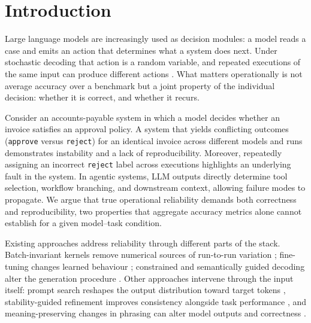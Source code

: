 \section{Introduction}
\label{sec:intro}

Large language models are increasingly used as decision modules: a model reads a
case and emits an action that determines what a system does next. Under stochastic
decoding that action is a random variable, and repeated executions of the same
input can produce different actions
\citep{Ouyang_2025,atil2025nondeterminismdeterministicllmsettings}. What matters
operationally is not average accuracy over a benchmark but a joint property of the
individual decision: whether it is correct, and whether it recurs.

Consider an accounts-payable system in which a model decides whether an invoice
satisfies an approval policy. A system that yields conflicting outcomes (\texttt{approve} versus \texttt{reject}) for an identical invoice across different models and runs demonstrates instability and a lack of reproducibility. Moreover, repeatedly assigning an incorrect \texttt{reject} label across executions highlights an underlying fault in the system. In agentic systems, LLM outputs directly determine tool selection, workflow branching, and downstream context, allowing failure modes to propagate. We argue that true operational reliability demands both correctness and reproducibility, two properties that aggregate accuracy metrics alone cannot establish for a given model–task condition.

Existing approaches address reliability through different parts of the
stack. Batch-invariant kernels remove numerical sources of run-to-run
variation \citep{he2025nondeterminism}; fine-tuning changes learned
behaviour \citep{tian2023finetuninglanguagemodelsfactuality};
constrained and semantically guided decoding alter the generation
procedure \citep{loula2025syntactic,ahmed2025semanticprobabilisticcontrollanguage}.
Other approaches intervene through the input itself: prompt search
reshapes the output distribution toward target tokens
\citep{bhargava2024whatsmagicwordcontrol}, stability-guided refinement
improves consistency alongside task performance
\citep{chen2025stability}, and meaning-preserving changes in phrasing
can alter model outputs and correctness
\citep{mizrahi-etal-2024-state,srikanth2024errorsnaturallanguagereasoning}.

